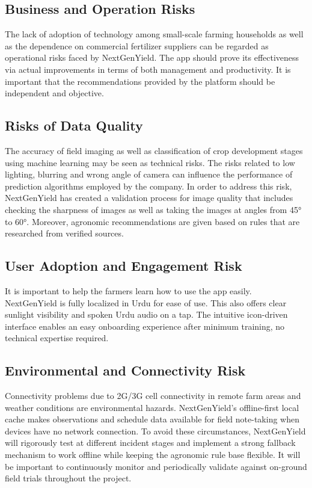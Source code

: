 \documentclass{FastFyp}
\begin{document}
\subsection{Business and Operation Risks}
The lack of adoption of technology among small-scale farming households as well as the dependence on commercial fertilizer suppliers can be regarded as operational risks faced by NextGenYield. The app should prove its effectiveness via actual improvements in terms of both management and productivity. It is important that the recommendations provided by the platform should be independent and objective. 

\subsection{Risks of Data Quality}
The accuracy of field imaging as well as classification of crop development stages using machine learning may be seen as technical risks. The risks related to low lighting, blurring and wrong angle of camera can influence the performance of prediction algorithms employed by the company. In order to address this risk, NextGenYield has created a validation process for image quality that includes checking the sharpness of images as well as taking the images at angles from 45° to 60°. Moreover, agronomic recommendations are given based on  rules that are researched from verified sources. 


\subsection{User Adoption and Engagement Risk}
It is important to help the farmers learn how to use the app easily.  NextGenYield is fully localized in Urdu for ease of use. This also offers clear sunlight visibility and spoken Urdu audio on a tap. The intuitive icon-driven interface enables an easy onboarding experience after minimum training, no technical expertise required. 

\subsection{Environmental and Connectivity Risk}
Connectivity problems due to 2G/3G cell connectivity in remote farm areas and weather conditions are environmental hazards. NextGenYield’s offline-first local cache makes observations and schedule data available for field note-taking when devices have no network connection. To avoid these circumstances, NextGenYield will rigorously test at different incident stages and implement a strong fallback mechanism to work offline while keeping the agronomic rule base flexible. It will be important to continuously monitor and periodically validate against on-ground field trials throughout the project.
\end{document}
